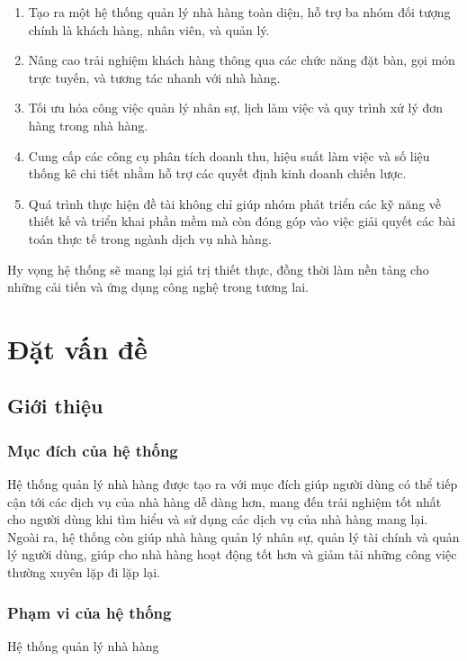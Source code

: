 \documentclass[a4paper,12pt]{article}
\begin{document}
\begin{enumerate}

  \item Tạo ra một hệ thống quản lý nhà hàng toàn diện, hỗ trợ ba nhóm đối tượng chính là khách hàng, nhân viên, và quản lý.
  \item Nâng cao trải nghiệm khách hàng thông qua các chức năng đặt bàn, gọi món trực tuyến, và tương tác nhanh với nhà hàng.
  \item Tối ưu hóa công việc quản lý nhân sự, lịch làm việc và quy trình xử lý đơn hàng trong nhà hàng.
  \item Cung cấp các công cụ phân tích doanh thu, hiệu suất làm việc và số liệu thống kê chi tiết nhằm hỗ trợ các quyết định kinh doanh chiến lược.
  \item Quá trình thực hiện đề tài không chỉ giúp nhóm phát triển các kỹ năng về thiết kế và triển khai phần mềm mà còn đóng góp vào việc giải quyết các bài toán thực tế trong ngành dịch vụ nhà hàng.
\end{enumerate}

Hy vọng hệ thống sẽ mang lại giá trị thiết thực, đồng thời làm nền tảng cho những cải tiến và ứng dụng công nghệ trong tương lai.

\newpage

\tableofcontents
\newpage

\section{Đặt vấn đề}
\subsection{Giới thiệu}
\subsubsection{Mục đích của hệ thống}
\begin{flushleft}

  Hệ thống quản lý nhà hàng được tạo ra với mục đích giúp người dùng có thể tiếp cận tới các dịch vụ của nhà hàng dễ dàng hơn, mang đến trải nghiệm tốt nhất cho người dùng khi tìm hiểu và sử dụng các dịch vụ của nhà hàng mang lại. Ngoài ra, hệ thống còn giúp nhà hàng quản lý nhân sự, quản lý tài chính và quản lý người dùng, giúp cho nhà hàng hoạt động tốt hơn và giảm tải những công việc thường xuyên lặp đi lặp lại.

\end{flushleft}
\subsubsection{Phạm vi của hệ thống}
\begin{flushleft}
  Hệ thống quản lý nhà hàng 
\end{flushleft}
\end{document}
